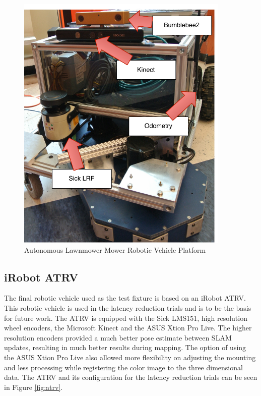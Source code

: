 \documentclass[12pt]{report}
\begin{document}
\begin{figure}[ht]
  \centering
  \includegraphics[width=4in,keepaspectratio]{lawnmower.pdf}
  \caption{Autonomous Lawnmower Mower Robotic Vehicle Platform}
  \label{fig:lawnmower}
\end{figure}

\subsection{iRobot ATRV}
The final robotic vehicle used as the test fixture is based on an iRobot ATRV.  This robotic vehicle is used in the latency reduction trials and is to be the basis for future work.  The ATRV is equipped with the Sick LMS151, high resolution wheel encoders, the Microsoft Kinect and the ASUS Xtion Pro Live.  The higher resolution encoders provided a much better pose estimate between SLAM updates, resulting in much better results during mapping.  The option of using the ASUS Xtion Pro Live also allowed more flexibility on adjusting the mounting and less processing while registering the color image to the three dimensional data.  The ATRV and its configuration for the latency reduction trials can be seen in Figure \ref{fig:atrv}.
\end{document}
